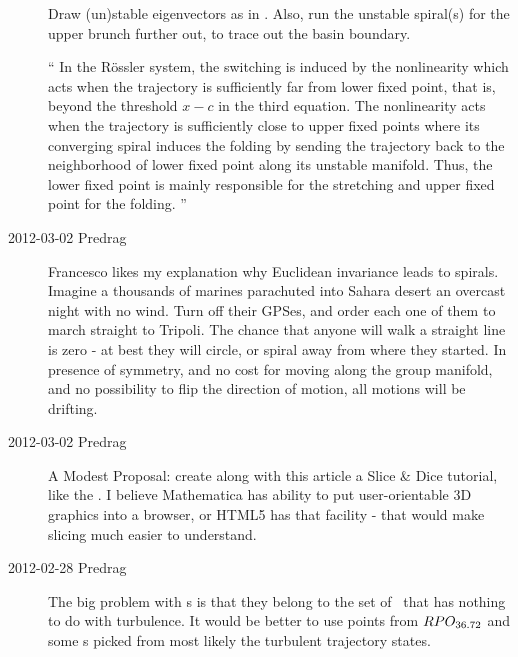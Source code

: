 \begin{description}
                                            \toCB
Draw (un)stable eigenvectors as in . Also, run
the unstable spiral(s) for the upper brunch further out, to trace out the
basin boundary.


``
In the R\"ossler system, the switching is induced by the nonlinearity
which acts when the trajectory is sufficiently far from lower fixed
point, that is, beyond the threshold $x-c$ in the third equation. The
nonlinearity acts when the trajectory is sufficiently close to upper
fixed points where its converging spiral induces the folding by sending
the trajectory back to the neighborhood of lower fixed point along its
unstable manifold. Thus, the lower fixed point is mainly responsible for
the stretching and upper fixed point for the folding.
''

\item[2012-03-02 Predrag] Francesco likes my explanation why Euclidean
invariance leads to spirals. Imagine a thousands of marines parachuted
into Sahara desert an overcast night with no wind. Turn off their GPSes,
and order each one of them to march straight to Tripoli. The chance that
anyone will walk a straight line is zero - at best they will circle, or
spiral away from where they started. In presence of symmetry, and no cost
for moving along the group manifold, and no possibility to flip the
direction of motion, all motions will be drifting.

\item[2012-03-02 Predrag]
A Modest Proposal: create along with this article a Slice \& Dice
tutorial, like the . I believe Mathematica has ability to put user-orientable 3D
graphics into a browser, or HTML5 has that facility - that would make
slicing much easier to understand.

\item[2012-02-28 Predrag]
    The big problem with  \template s
    is that they belong to the set of \reqva\ that has nothing to do with
    turbulence. It would be better to use points from $RPO_{36.72}$ and
    some \template s picked from most likely the turbulent trajectory
    states.


\end{description}

